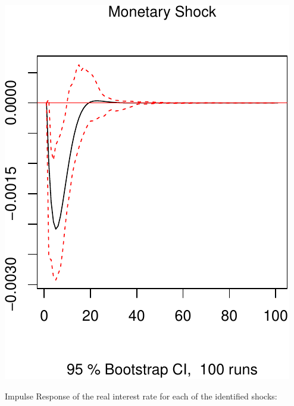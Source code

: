 \documentclass[11pt,preprint, authoryear]{elsarticle}
\numberwithin{equation}{section}
\numberwithin{figure}{section}
\numberwithin{table}{section}
\begin{document}
\includegraphics{TS_proj_files/figure-latex/unnamed-chunk-36-3.pdf}

Impulse Response of the real interest rate for each of the identified
shocks:
\end{document}
